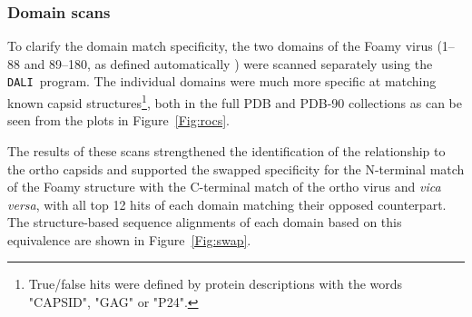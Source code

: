 \documentclass[preprint,12pt]{elsarticle}
\newcommand{\DALI}{{\tt DALI}}
\newcommand{\Fig}[1]{Figure~\ref{Fig:#1}}
\begin{document}
\subsubsection{Domain scans}

To clarify the domain match specificity, the two domains of the Foamy virus (1--88 and 89--180,
as defined automatically \cite{TaylorWR99b}) were scanned separately using the \DALI\ program.
The individual domains were much more specific at matching known capsid structures\footnote{
True/false hits were defined by protein descriptions with the words "CAPSID", "GAG" or "P24".
},
both in the full PDB and PDB-90 collections as can be seen from the plots in \Fig{rocs}.

The results of these scans strengthened the identification
of the relationship to the ortho capsids and supported the swapped specificity for the N-terminal
match of the Foamy structure with the C-terminal match of the ortho virus and {\em vica versa}, with all
top 12 hits of each domain matching their opposed counterpart.
The structure-based sequence alignments of each domain based on this equivalence are shown in \Fig{swap}.
\end{document}
